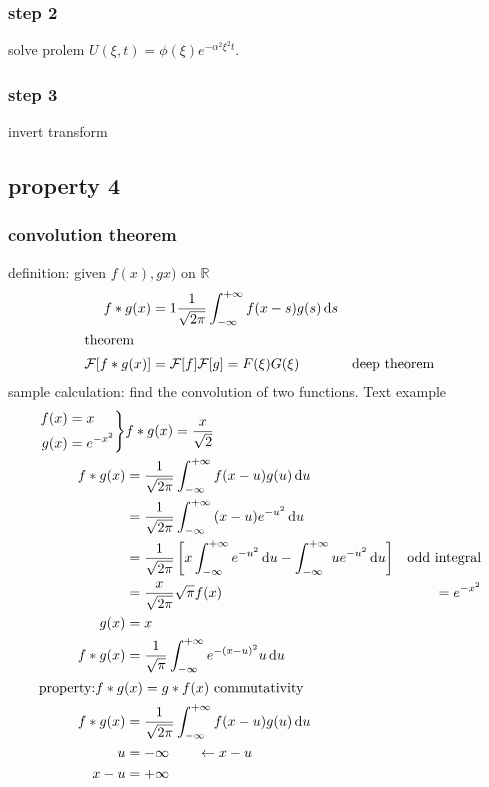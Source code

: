 \documentclass{article}
\begin{document}
\subsubsection*{step 2}
solve prolem $U(\xi,t)=\phi(\xi)e^{-\alpha ^2\xi^2 t}$.
\subsubsection*{step 3}
invert transform

\subsection*{property 4}
\subsubsection*{convolution theorem}
definition: given $f(x),gx)$ on $\mathbb{R}$
\begin{align*}
  f*g(x)&=1\frac{1}{\sqrt{2\pi }}\int_{-\infty}^{+\infty}{f(x-s)g(s)\,\mathrm{d}s}\\
  \intertext{theorem}
  \mathcal{F}[f*g(x)]&=\mathcal{F}[f]\mathcal{F}[g]=F(\xi)G(\xi)&\text{deep theorem}
\end{align*}
sample calculation: find the convolution of two functions. Text example
\begin{align*}
  \left.\begin{aligned}
    f(x)&=x\\
    g(x)&=e^{-x^2}
  \end{aligned}\right\}&f*g(x)=\frac{x}{\sqrt{2}}\\
  f*g(x)&=\frac{1}{\sqrt{2\pi }}\int_{-\infty}^{+\infty}{f(x-u)g(u)\,\mathrm{d}u}\\
  &=\frac{1}{\sqrt{2\pi }}\int_{-\infty}^{+\infty}{(x-u)e^{-u^2}\,\mathrm{d}u}\\
  &=\frac{1}{\sqrt{2\pi }}\left[x\int_{-\infty}^{+\infty}{e^{-u^2}\,\mathrm{d}u}-\int_{-\infty}^{+\infty}{ue^{-u^2}\,\mathrm{d}u}\right]&\text{odd integral}\\
  &=\frac{x}{\sqrt{2\pi }}\sqrt{\pi }
  f(x)&=e^{-x^2}\\
  g(x)&=x\\
  f*g(x)&=\frac{1}{\sqrt{\pi }}\int_{-\infty}^{+\infty}{e^{-(x-u)^2}u\,\mathrm{d}u}\\
  \intertext{property:$f*g(x)=g*f(x)$ commutativity}
  f*g(x)&=\frac{1}{\sqrt{2\pi }}\int_{-\infty}^{+\infty}{f(x-u)g(u)\,\mathrm{d}u}\\
  u&=-\infty\qquad\gets x-u\\
  x-u&=+\infty
\end{align*}
\end{document}
